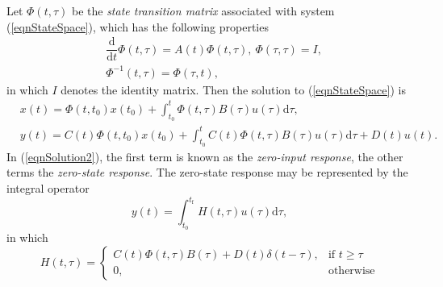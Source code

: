 \documentclass[12pt,xcolor={table},aspectratio=169]{beamer}
\begin{document}
\begin{frame}[noframenumbering]
Let $\Phi(t,\tau)$ be the \emph{state transition matrix} associated with system (\ref{eqnStateSpace}), which has the following properties
\begin{subequations} \label{eqnSTM}
     \begin{align}
      & \dfrac{\mathrm{d}}{\mathrm{d}t} \Phi(t,\tau) =  A(t)\Phi(t,\tau),\ \Phi(\tau,\tau) = I, \label{eqnSTMp1}\\
      & \Phi^{-1}(t,\tau) = \Phi(\tau,t), \label{eqnSTMp3}
     \end{align}
\end{subequations}
in which $I$ denotes the identity matrix. 
Then the solution to (\ref{eqnStateSpace}) is
\begin{subequations} \label{eqnSolution}
     \begin{align}
      & x(t) = \Phi(t,t_0)x(t_0) + \int_{t_0}^{t} \Phi(t,\tau) B(\tau)u(\tau) \mathrm{d}\tau, \label{eqnSolution1}\\
      & y(t) = C(t)\Phi(t,t_0)x(t_0) + \int_{t_0}^{t} C(t)\Phi(t,\tau) B(\tau)u(\tau) \mathrm{d}\tau + D(t)u(t).\label{eqnSolution2} 
     \end{align}
\end{subequations}
In (\ref{eqnSolution2}), the first term is known as the \emph{zero-input response}, the other terms the \emph{zero-state response}. The zero-state response may be represented by the integral operator
\begin{equation}
\label{eqnImpulseRF}
y(t) = \int_{t_0}^{t_{\mathrm{f}}} H(t,\tau) u(\tau) \mathrm{d}\tau,
\end{equation}
in which 
\begin{equation}
\label{eqnImpulseRFSS}
    H(t,\tau)= 
\begin{cases}
    C(t)\Phi(t,\tau) B(\tau)+D(t)\delta(t-\tau),& \text{if } t\geq \tau\\
    0,              & \text{otherwise}
\end{cases}
\end{equation}
\end{frame}
\end{document}
